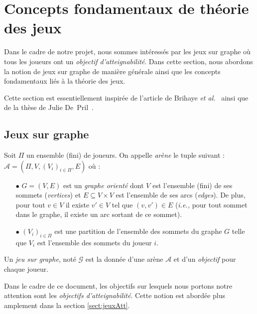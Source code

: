 
\section{Concepts fondamentaux de théorie des jeux}
\label{section:conceptsFond}

Dans le cadre de notre projet, nous sommes intéressés par les jeux sur graphe où tous les joueurs ont un \textit{objectif d'atteignabilité}.
Dans cette section, nous abordons la notion de jeux sur graphe de manière générale ainsi que les concepts fondamentaux liés à la théorie des jeux.

Cette section est essentiellement inspirée de l'article de Brihaye \emph{et al.}~\cite{DBLP:conf/lfcs/BrihayePS13} ainsi que de la thèse de Julie De~Pril~\cite{juliePhd}.

\subsection{Jeux sur graphe}




\begin{defi}[Arène]
	Soit $\Pi$ un ensemble (fini) de joueurs. On appelle \textit{arène} le tuple suivant :\\
	 $\mathcal{A} = (\Pi,V , (V_{i})_{i\in{\Pi}}, E )$ où :
	\begin{enumerate}
		\item[$\bullet$] $G = (V,E)$ est un \textit{graphe orienté}  dont $V$ est l'ensemble (fini) de ses sommets (\textit{vertices}) et $E \subseteq V \times V$ est l'ensemble de ses arcs (\textit{edges}). De plus, pour tout $ v\in V $ il existe $v'\in V$ tel que $(v,v') \in E$ (\emph{i.e.,} pour tout sommet dans le graphe, il existe un arc sortant de ce sommet).
		\item[$\bullet$] $(V_{i})_{i\in\Pi}$ est une partition de l'ensemble des sommets du graphe $G$ telle que $V_{i}$ est l'ensemble des sommets du joueur $i$.
	\end{enumerate}
\end{defi}


\begin{defi}
	Un \textit{jeu sur graphe}, noté $\mathcal{G}$ est la donnée d'une arène $\mathcal{A}$ et d'un \textit{objectif} pour chaque joueur.
\end{defi}


	Dans le cadre de ce document, les objectifs sur lesquels nous portons notre attention sont les \textit{objectifs d'atteignabilité}. Cette notion est abordée plus amplement dans la section \ref{sect:jeuxAtt}.



